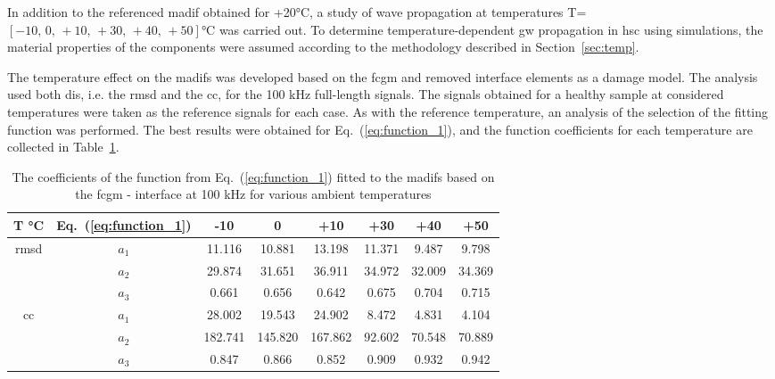 \documentclass[11pt,a4paper,final]{report}
\theoremstyle{plain}
\begin{document}
In addition to the referenced \ac{madif} obtained for +20\unit{\degreeCelsius}, a study of wave propagation at temperatures T=\(\left[-10,\,0,\,+10,\,+30,\,+40,\,+50\right]\)\unit{\degreeCelsius} was carried out.
To determine temperature-dependent \ac{gw} propagation in \ac{hsc} using simulations, the material properties of the components were assumed according to the methodology described in Section~\ref{sec:temp}.

The temperature effect on the \acp{madif} was developed based on the \ac{fcgm} and removed interface elements as a damage model.
The analysis used both \acp{di}, i.e. the \ac{rmsd} and the \ac{cc}, for the 100 \unit{\kHz} full-length signals.
The signals obtained for a healthy sample at considered temperatures were taken as the reference signals for each case.
As with the reference temperature, an analysis of the selection of the fitting function was performed.
The best results were obtained for Eq.~(\ref{eq:function_1}), and the function coefficients for each temperature are collected in Table~\ref{tab:fit_F_err_temp}.
\begin{table}[!tbh]
	\small
	\tabcolsep=0.25cm
	\centering
	\caption{\label{tab:fit_F_err_temp} The coefficients of the function from Eq.~(\ref{eq:function_1}) fitted to the \aclp{madif} based on the \acl{fcgm} - interface at 100 \unit{\kHz} for various ambient temperatures}
	\begin{tabular}{cccccccc}
		\toprule
		{T \unit{\degreeCelsius}} & Eq.~(\ref{eq:function_1}) & -10 & 0 & +10 & +30 & +40 & +50\\
		\midrule
		\multirow{3}{*}{\ac{rmsd}} & $a_1$ & 11.116 & 10.881 & 13.198 & 11.371 & 9.487 & 9.798\\
		 & $a_2$ & 29.874 & 31.651 & 36.911 & 34.972 & 32.009 & 34.369\\
		 & $a_3$ & 0.661 & 0.656 & 0.642 & 0.675 & 0.704 & 0.715\\
		\midrule
		\multirow{3}{*}{\ac{cc}} & $a_1$ & 28.002 & 19.543 & 24.902 & 8.472 & 4.831 & 4.104\\
		& $a_2$ & 182.741 & 145.820 & 167.862 & 92.602 & 70.548 & 70.889\\
		& $a_3$ & 0.847 & 0.866 & 0.852 & 0.909 & 0.932 & 0.942\\
		\bottomrule
	\end{tabular}
\end{table}
\end{document}
